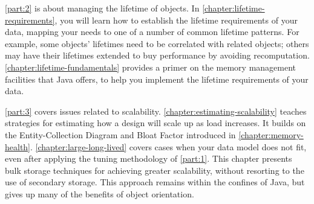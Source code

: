 \begin{comment}
[NMM 20120628 too much E-C diagram detail for intro?]
A data model implementation begins with a conceptual understanding of the
entities and relationships in the model.  This may be an informal understanding,
or it may be formalized in a diagram such as an E-R diagram or a UML class
diagram.  At some point that conceptual model is turned into Java classes that
represent the entities, attributes, and assocations of the model, as well as any
auxiliary structures, such as indexes, needed to access the data.  The example
below shows a simple conceptual model, using a UML class diagram.  A Java
implementation of that model is also shown, using rectangles for classes and
arrows for references.  %
in that it shows
\end{comment}


\autoref{part:2} is about managing the lifetime of objects. In
\autoref{chapter:lifetime-requirements}, you will learn how to establish the
lifetime requirements of your data, mapping your needs to one of a number
of common lifetime patterns.
For example, some objects' lifetimes need to be correlated with
related objects; others may have their lifetimes extended to buy
performance by avoiding recomputation.
\autoref{chapter:lifetime-fundamentals} provides a primer on the memory
management facilities that Java offers, to help you implement the lifetime
requirements of your data.



\autoref{part:3} covers issues related to scalability.
\autoref{chapter:estimating-scalability} teaches strategies for estimating
how a design will scale up as load increases.
It builds on the Entity-Collection Diagram and Bloat Factor introduced in
\autoref{chapter:memory-health}.
\autoref{chapter:large-long-lived} covers cases when your data model does not fit, even after
applying the tuning methodology of \autoref{part:1}. This chapter presents
bulk storage techniques for achieving greater scalability, without
resorting to the use of secondary storage. This approach remains
within the confines of Java, but gives up many of the benefits of object
orientation.

